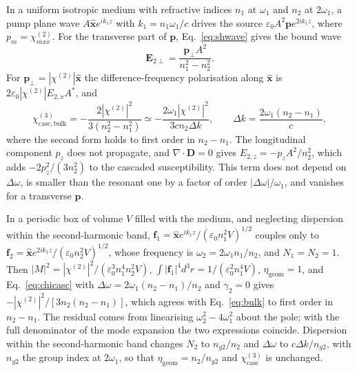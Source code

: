 \documentclass[9pt]{osa-supplemental-document}
\newcommand{\chitwo}{\chi^{(2)}}
\newcommand{\chicasc}{\chi^{(3)}_{\mathrm{casc}}}
\newcommand{\Dom}{\Delta\omega}
\newcommand{\etag}{\eta_{\mathrm{geom}}}
\newcommand{\f}{\mathbf f}
\begin{document}
In a uniform isotropic medium with refractive indices $n_1$ at $\omega_1$
and $n_2$ at $2\omega_1$, a pump plane wave $A\hat{\mathbf x}e^{ik_1z}$ with
$k_1=n_1\omega_1/c$ drives the source $\varepsilon_0A^2\mathbf pe^{2ik_1z}$,
where $p_m=\chitwo_{mxx}$.  For the transverse part of $\mathbf p$,
Eq.~\eqref{eq:shwave} gives the bound wave
\begin{equation}
  \mathbf E_{2\perp}=\frac{\mathbf p_\perp A^2}{n_1^2-n_2^2}.
\end{equation}
For $\mathbf p_\perp=|\chitwo|\hat{\mathbf x}$ the difference-frequency
polarisation along $\hat{\mathbf x}$ is $2\varepsilon_0|\chitwo|E_{2,x}A^*$,
and
\begin{equation}
  \chi^{(3)}_{\mathrm{casc,bulk}}=-\frac{2|\chitwo|^2}{3(n_2^2-n_1^2)}
  \simeq-\frac{2\omega_1|\chitwo|^2}{3cn_2\Delta k},\qquad
  \Delta k=\frac{2\omega_1(n_2-n_1)}{c},
  \label{eq:bulk}
\end{equation}
where the second form holds to first order in $n_2-n_1$.  The longitudinal
component $p_z$ does not propagate, and $\nabla\cdot\mathbf D=0$ gives
$E_{2,z}=-p_zA^2/n_2^2$, which adds $-2p_z^2/(3n_2^2)$ to the cascaded
susceptibility.  This term does not depend on $\Dom$, is smaller than the
resonant one by a factor of order $|\Dom|/\omega_1$, and vanishes for a
transverse $\mathbf p$.

In a periodic box of volume $V$ filled with the medium, and neglecting
dispersion within the second-harmonic band,
$\f_1=\hat{\mathbf x}e^{ik_1z}/(\varepsilon_0n_1^2V)^{1/2}$ couples only to
$\f_2=\hat{\mathbf x}e^{2ik_1z}/(\varepsilon_0n_2^2V)^{1/2}$, whose
frequency is $\omega_2=2\omega_1n_1/n_2$, and $N_1=N_2=1$.  Then
$|M|^2=|\chitwo|^2/(\varepsilon_0^3n_1^4n_2^2V)$,
$\int|\f_1|^4d^3r=1/(\varepsilon_0^2n_1^4V)$, $\etag=1$, and
Eq.~\eqref{eq:chicasc} with $\Dom=2\omega_1(n_2-n_1)/n_2$ and $\gamma_2=0$
gives $-|\chitwo|^2/[3n_2(n_2-n_1)]$, which agrees with Eq.~\eqref{eq:bulk} to
first order in $n_2-n_1$.  The residual comes from linearising
$\omega_2^2-4\omega_1^2$ about the pole; with the full denominator of the
mode expansion the two expressions coincide.  Dispersion within the
second-harmonic band changes $N_2$ to $n_{g2}/n_2$ and $\Dom$ to
$c\Delta k/n_{g2}$, with $n_{g2}$ the group index at $2\omega_1$, so that
$\etag=n_2/n_{g2}$ and $\chicasc$ is unchanged.
\end{document}
